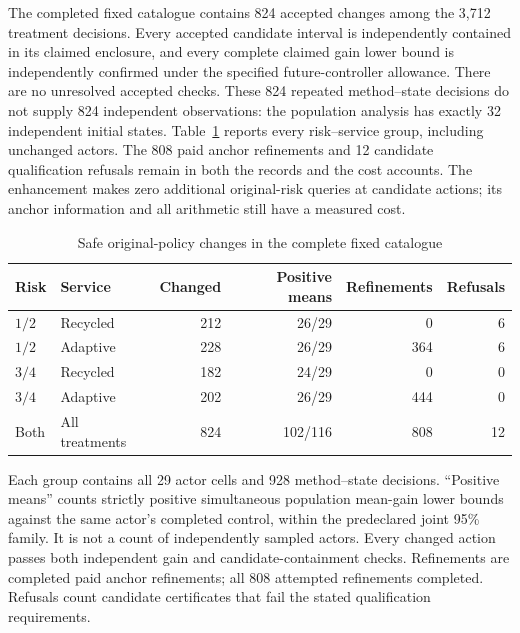 The completed fixed catalogue contains 824 accepted changes among the 3,712
treatment decisions. Every accepted candidate interval is independently
contained in its claimed enclosure, and every complete claimed gain lower
bound is independently confirmed under the specified future-controller
allowance. There are no unresolved accepted checks. These 824 repeated
method--state decisions do not supply 824 independent observations: the
population analysis has exactly 32 independent initial states.
Table~\ref{tab:actionresults122} reports every risk--service group, including
unchanged actors. The 808 paid anchor refinements and 12 candidate
qualification refusals remain in both the records and the cost accounts.
The enhancement makes zero additional original-risk queries at candidate
actions; its anchor information and all arithmetic still have a measured cost.

\begin{table}[t]
\centering
\caption{Safe original-policy changes in the complete fixed catalogue}
\label{tab:actionresults122}
\begin{tabular}{llrrrr}
\toprule
Risk & Service & Changed & Positive means & Refinements & Refusals\\
\midrule
$1/2$ & Recycled & 212 & 26/29 & 0 & 6\\
$1/2$ & Adaptive & 228 & 26/29 & 364 & 6\\
$3/4$ & Recycled & 182 & 24/29 & 0 & 0\\
$3/4$ & Adaptive & 202 & 26/29 & 444 & 0\\
\midrule
Both & All treatments & 824 & 102/116 & 808 & 12\\
\bottomrule
\end{tabular}
\par\smallskip
\begin{minipage}{0.98\linewidth}\footnotesize
Each group contains all 29 actor cells and 928 method--state decisions.
``Positive means'' counts strictly positive simultaneous population
mean-gain lower bounds against the same actor's completed control, within
the predeclared joint 95\% family. It is not a count of independently
sampled actors. Every changed action passes both independent gain and
candidate-containment checks. Refinements are completed paid anchor
refinements; all 808 attempted refinements completed. Refusals count
candidate certificates that fail the stated qualification requirements.
\end{minipage}
\end{table}

